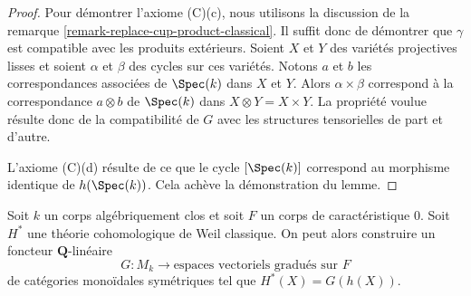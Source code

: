 \begin{proof}
\medskip\noindent
Pour démontrer l'axiome (C)(c), nous utilisons la discussion de
la remarque \ref{remark-replace-cup-product-classical}.
Il suffit donc de démontrer que $\gamma$ est compatible avec
les produits extérieurs. Soient $X$ et $Y$ des variétés projectives lisses
et soient $\alpha$ et $\beta$ des cycles sur ces variétés. Notons
$a$ et $b$ les correspondances associées de $\Spec(k)$ dans
$X$ et $Y$. Alors $\alpha \times \beta$ correspond à
la correspondance $a \otimes b$ de $\Spec(k)$ dans $X \otimes Y = X \times Y$.
La propriété voulue résulte donc de la compatibilité de $G$
avec les structures tensorielles de part et d'autre.

\medskip\noindent
L'axiome (C)(d) résulte de ce que le cycle $[\Spec(k)]$
correspond au morphisme identique de $h(\Spec(k))$.
Cela achève la démonstration du lemme.
\end{proof}

\begin{lemma}
\label{lemma-from-weil-to-functor-classical}
Soit $k$ un corps algébriquement clos et soit $F$ un corps de
caractéristique $0$. Soit $H^*$ une théorie cohomologique de Weil classique.
On peut alors construire un foncteur $\mathbf{Q}$-linéaire
$$
G : M_k \longrightarrow \text{espaces vectoriels gradués sur }F\text{}
$$
de catégories monoïdales symétriques tel que $H^*(X) = G(h(X))$.
\end{lemma}

